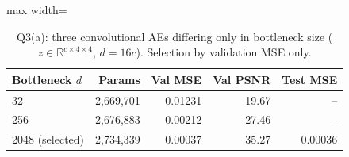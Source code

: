 \begin{table}[!tbp]\centering\footnotesize\setlength{\tabcolsep}{3pt}
\begin{adjustbox}{max width=\columnwidth}
\begin{tabular}{lrrrr}\toprule
Bottleneck $d$ & Params & Val MSE & Val PSNR & Test MSE \\\midrule
32 & 2,669,701 & 0.01231 & 19.67 & -- \\
256 & 2,676,883 & 0.00212 & 27.46 & -- \\
2048 (selected) & 2,734,339 & 0.00037 & 35.27 & 0.00036 \\
\bottomrule\end{tabular}
\end{adjustbox}
\caption{Q3(a): three convolutional AEs differing only in bottleneck size ($z\in\mathbb{R}^{c\times4\times4}$, $d=16c$). Selection by validation MSE only.}\label{tab:q3a}\end{table}

